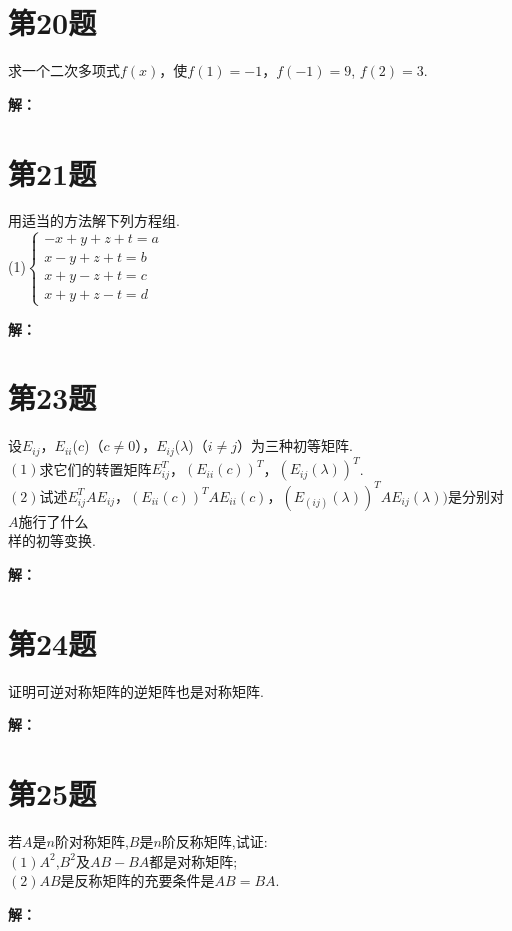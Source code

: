 \documentclass[a4paper, 12pt]{ctexart}
\begin{document}
\section{第20题}
\begin{exercise}
求一个二次多项式$f(x)$，使$f(1) = -1$，$f(-1) = 9$, $f(2) = 3 $.

\end{exercise}
\noindent\textbf{解：}


\section{第21题}
\begin{exercise}
用适当的方法解下列方程组.~\\

(1)$\left\{\begin{matrix}
-x+y+z+t = a \\
x-y+z+t = b \\
x+y-z+t = c \\
x+y+z-t = d
\end{matrix}\right.$
\end{exercise}
\noindent\textbf{解：}

\section{第23题}
\begin{exercise}
设$E_{ij}$，$E_{ii}$($c$)（$c\ne0$），$E_{ij}$($\lambda$)（$i\ne j$）为三种初等矩阵.~\\

$(1)$求它们的转置矩阵$E_{ij}^T$，$(E_{ii}(c))^T$，$(E_{ij}(\lambda))^T$.~\\

$(2)$试述$E_{ij}^TAE_{ij}$，$(E_{ii}(c))^TAE_{ii}(c)$，$(E_(ij)(\lambda))^TAE_{ij}(\lambda))$是分别对$A$施行了什么\\

样的初等变换.
\end{exercise}
\noindent\textbf{解：}

\section{第24题}
\begin{exercise}
证明可逆对称矩阵的逆矩阵也是对称矩阵.
\end{exercise}
\noindent\textbf{解：}

\section{第25题}
\begin{exercise}
若$A$是$n$阶对称矩阵,$B$是$n$阶反称矩阵,试证:~\\

$(1)A^2$,$B^2$及$AB- BA$都是对称矩阵;\\

$(2)AB$是反称矩阵的充要条件是$AB = BA$.
\end{exercise}
\noindent\textbf{解：}
\end{document}
